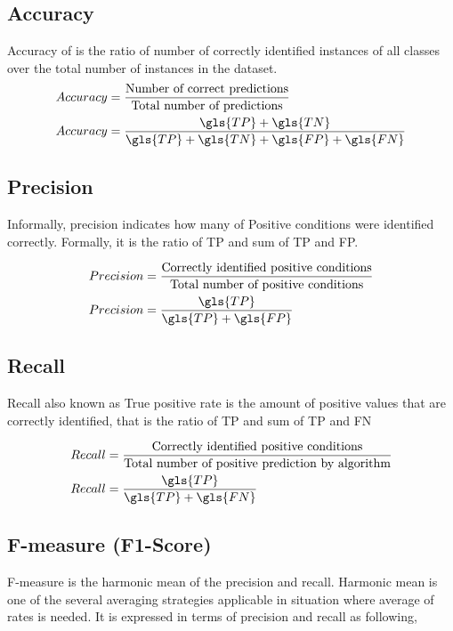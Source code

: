 \subsection*{Accuracy}
Accuracy of is the ratio of number of correctly identified instances of all classes over the total number of instances in the dataset. 
\begin{align}
    Accuracy &= \frac{\text{Number of correct predictions}}{\text{Total number of predictions}}\\
    Accuracy &= \frac{\gls{TP}+\gls{TN}}{\gls{TP}+\gls{TN}+\gls{FP}+\gls{FN}}
\end{align}



\subsection*{Precision}
Informally, precision indicates how many of Positive conditions were identified correctly. Formally, it is the ratio of \gls{TP} and sum of \gls{TP} and \gls{FP}.

\begin{align}
    Precision &= \frac{\text{Correctly identified positive conditions}}{\text{Total number of positive conditions}}\\
    Precision &= \frac{\gls{TP}}{\gls{TP}+\gls{FP}}
\end{align}

\subsection*{Recall}
Recall also known as True positive rate is the amount of positive values that are correctly identified, that is the ratio of \gls{TP} and sum of \gls{TP} and \gls{FN}

\begin{align}
    Recall &= \frac{\text{Correctly identified positive conditions}}{\text{Total number of positive prediction by algorithm}}\\
    Recall &= \frac{\gls{TP}}{\gls{TP}+\gls{FN}}
\end{align}

\subsection*{F-measure (F1-Score)}
F-measure is the harmonic mean of the precision and recall. Harmonic mean is one of the several averaging strategies applicable in situation where average of rates is needed. It is expressed in terms of precision and recall as following,

